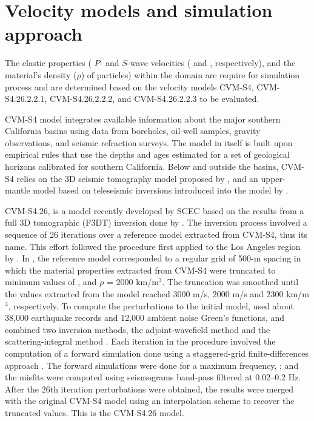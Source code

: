 
\section{Velocity models and simulation approach}


The elastic properties ( $P$- and $S$-wave velocities (\vp{} and \vs{}, respectively), and the material's density ($\rho$) of particles) within the domain are require for simulation process and are determined based on the velocity models CVM-S4, CVM-S4.26.2.2.1, CVM-S4.26.2.2.2, and CVM-S4.26.2.2.3 to be evaluated. 

CVM-S4 model integrates available information about the major southern California basins using data from boreholes, oil-well samples, gravity observations, and seismic refraction surveys. The model in itself is built upon empirical rules that use the depths and ages estimated for a set of geological horizons calibrated for southern California. Below and outside the basins, CVM-S4 relies on the 3D seismic tomography model proposed by \citet{Hauksson_2000_JGR}, and an upper-mantle model based on teleseismic inversions introduced into the model by \citet{Kohler_2003_BSSA}.

CVM-S4.26, is a model recently developed by SCEC based on the results from a full 3D tomographic (F3DT) inversion done by \citet{Lee_2014_JGR}. The inversion process involved a sequence of 26 iterations over a reference model extracted from CVM-S4, thus its name. This effort followed the procedure first applied to the Los Angeles region by \citet{Chen_2007_BSSA}. In \citet{Lee_2014_JGR}, the reference model corresponded to a regular grid of 500-m spacing in which the material properties extracted from CVM-S4 were truncated to minimum values of ,  and $\rho$ = 2000 km/m$^3$. The truncation was smoothed until the values extracted from the model reached 3000 m/s, 2000 m/s and 2300 km/m$^3$, respectively. To compute the perturbations to the initial model, \citet{Lee_2014_JGR} used about 38,000 earthquake records and 12,000 ambient noise Green's functions, and combined two inversion methods, the adjoint-wavefield method \citep[AW-F3DT;][]{Tromp_2005_GJI} and the scattering-integral method \citep[SI-F3DT;][]{Zhao_2005_BSSA}. Each iteration in the procedure involved the computation of a forward simulation done using a staggered-grid finite-differences approach \citep{Olsen_1994_Thesis}. The forward simulations were done for a maximum frequency, ; and the misfits were computed using seismograms band-pass filtered at 0.02--0.2 Hz. After the 26th iteration perturbations were obtained, the results were merged with the original CVM-S4 model using an interpolation scheme to recover the truncated values. This is the CVM-S4.26 model.

